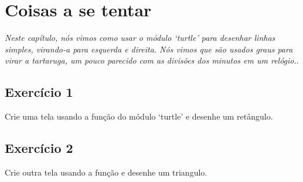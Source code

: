 \section{Coisas a se tentar}

\emph{Neste capítulo, nós vimos como usar o módulo `turtle' para desenhar linhas simples, virando-a para esquerda e direita. Nós vimos que são usados graus para virar a tartaruga, um pouco parecido com as divisões dos minutos em um relógio.}.

\subsection*{Exercício 1}
Crie uma tela usando a função  do módulo `turtle' e desenhe um retângulo.

\subsection*{Exercício 2}
Crie outra tela usando a função  e desenhe um triangulo.

\newpage

